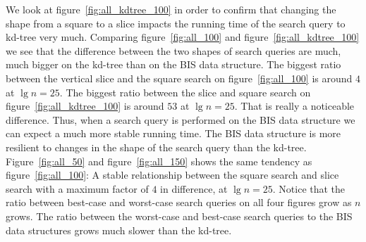 We look at figure~\ref{fig:all_kdtree_100} in order to confirm that changing the shape from a square to a slice impacts the running time of the search query to kd-tree very much. Comparing figure~\ref{fig:all_100} and figure~\ref{fig:all_kdtree_100} we see that the difference between the two shapes of search queries are much, much bigger on the kd-tree than on the BIS data structure. The biggest ratio between the vertical slice and the square search on figure~\ref{fig:all_100} is around $4$ at $\lg n = 25$. The biggest ratio between the slice and square search on figure~\ref{fig:all_kdtree_100} is around $53$ at $\lg n = 25$. That is really a noticeable difference. Thus, when a search query is performed on the BIS data structure we can expect a much more stable running time. The BIS data structure is more resilient to changes in the shape of the search query than the kd-tree. Figure~\ref{fig:all_50} and figure~\ref{fig:all_150} shows the same tendency as figure~\ref{fig:all_100}: A stable relationship between the square search and slice search with a maximum factor of $4$ in difference, at $\lg n = 25$. Notice that the ratio between best-case and worst-case search queries on all four figures grow as $n$ grows. The ratio between the worst-case and best-case search queries to the BIS data structures grows much slower than the kd-tree. \\



%  


